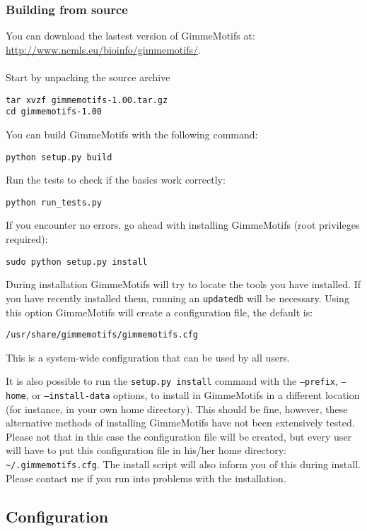 \documentclass[11pt]{article}
\begin{document}
\subsubsection{Building from source}
You can download the lastest version of GimmeMotifs at:\\
\url{http://www.ncmls.eu/bioinfo/gimmemotifs/}. \\
\\
Start by unpacking the source archive
\begin{verbatim}
tar xvzf gimmemotifs-1.00.tar.gz
cd gimmemotifs-1.00
\end{verbatim}
You can build GimmeMotifs with the following command:
\begin{verbatim}
python setup.py build
\end{verbatim}
Run the tests to check if the basics work correctly:
\begin{verbatim}
python run_tests.py
\end{verbatim}
If you encounter no errors, go ahead with installing GimmeMotifs (root privileges required):
\begin{verbatim}
sudo python setup.py install
\end{verbatim}
During installation GimmeMotifs will try to locate the tools you have installed. If you have recently installed them, running an \texttt{updatedb} will be necessary. Using this option GimmeMotifs will create a configuration file, the default is:
\begin{verbatim}
/usr/share/gimmemotifs/gimmemotifs.cfg
\end{verbatim}
This is a system-wide configuration that can be used by all users.

It is also possible to run the \texttt{setup.py install} command with the \texttt{--prefix}, \texttt{--home}, or \texttt{--install-data} options, to install in GimmeMotifs in a different location (for instance, in your own home directory). This should be fine, however, these alternative methods of installing GimmeMotifs have not been extensively tested. Please not that in this case the configuration file will be created, but every user will have to put this configuration file in his/her home directory: \texttt{\textasciitilde{}/.gimmemotifs.cfg}. The install script will also inform you of this during install. Please contact me if you run into problems with the installation.

\subsection{Configuration}
\label{sec:configuration}
\end{document}
